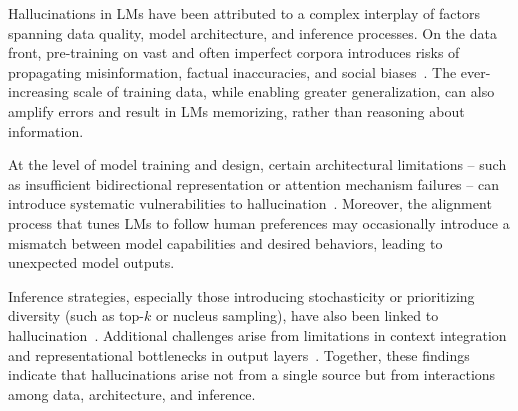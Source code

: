 
Hallucinations in LMs have been attributed to a complex interplay of factors spanning data quality, model architecture, and inference processes. On the data front, pre-training on vast and often imperfect corpora introduces risks of propagating misinformation, factual inaccuracies, and social biases~\citep{lin-etal-2022-truthfulqa, lee_deduplicating_2022, hernandez2022scalinglawsinterpretabilitylearning, data_paullada_2021, narayanan-venkit-etal-2023-nationality, ladhak-etal-2023-pre, kasai2024realtimeqawhatsanswer}. The ever-increasing scale of training data, while enabling greater generalization, can also amplify errors and result in LMs memorizing, rather than reasoning about information.

At the level of model training and design, certain architectural limitations -- such as insufficient bidirectional representation or attention mechanism failures -- can introduce systematic vulnerabilities to hallucination~\citep{li2023batgptbidirectionalautoregessivetalker, liu2023exposingattentionglitchesflipflop, wang_exposure_2020, sharma_towards_2023}. Moreover, the alignment process that tunes LMs to follow human preferences may occasionally introduce a mismatch between model capabilities and desired behaviors, leading to unexpected model outputs.

Inference strategies, especially those introducing stochasticity or prioritizing diversity (such as top-$k$ or nucleus sampling), have also been linked to hallucination~\citep{fan-etal-2018-hierarchical, holtzman_curious_2019, dziri-etal-2021-neural, chuang2024doladecodingcontrastinglayers}. Additional challenges arise from limitations in context integration and representational bottlenecks in output layers~\citep{liu_instruction_2023, shi2023trustingevidencehallucinatecontextaware, yang2018breakingsoftmaxbottleneckhighrank, chang_softmax_2022}. Together, these findings indicate that hallucinations arise not from a single source but from interactions among data, architecture, and inference.


